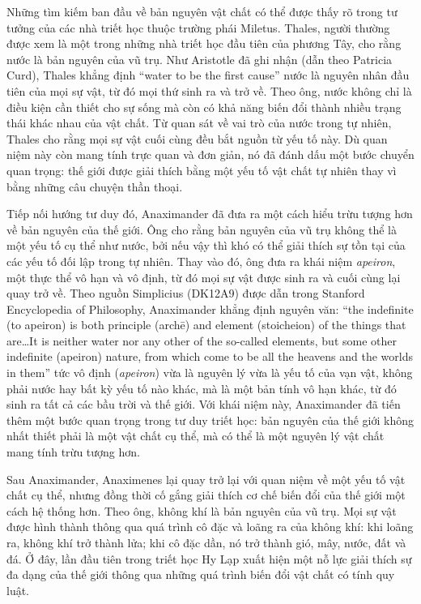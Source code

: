 \documentclass[14pt,a4paper]{extarticle}
\begin{document}
Những tìm kiếm ban đầu về bản nguyên vật chất có thể được thấy rõ trong tư tưởng của các nhà triết học thuộc trường phái Miletus. Thales, người thường được xem là một trong những nhà triết học đầu tiên của phương Tây, cho rằng nước là bản nguyên của vũ trụ. Như Aristotle đã ghi nhận (dẫn theo Patricia Curd), Thales khẳng định ``water to be the first cause''\cite{sep-presocratic} nước là nguyên nhân đầu tiên của mọi sự vật, từ đó mọi thứ sinh ra và trở về. Theo ông, nước không chỉ là điều kiện cần thiết cho sự sống mà còn có khả năng biến đổi thành nhiều trạng thái khác nhau của vật chất. Từ quan sát về vai trò của nước trong tự nhiên, Thales cho rằng mọi sự vật cuối cùng đều bắt nguồn từ yếu tố này. Dù quan niệm này còn mang tính trực quan và đơn giản, nó đã đánh dấu một bước chuyển quan trọng: thế giới được giải thích bằng một yếu tố vật chất tự nhiên thay vì bằng những câu chuyện thần thoại.

Tiếp nối hướng tư duy đó, Anaximander đã đưa ra một cách hiểu trừu tượng hơn về bản nguyên của thế giới. Ông cho rằng bản nguyên của vũ trụ không thể là một yếu tố cụ thể như nước, bởi nếu vậy thì khó có thể giải thích sự tồn tại của các yếu tố đối lập trong tự nhiên. Thay vào đó, ông đưa ra khái niệm \emph{apeiron}, một thực thể vô hạn và vô định, từ đó mọi sự vật được sinh ra và cuối cùng lại quay trở về. Theo nguồn Simplicius (DK12A9) được dẫn trong Stanford Encyclopedia of Philosophy, Anaximander khẳng định nguyên văn: ``the indefinite (to apeiron) is both principle (archē) and element (stoicheion) of the things that are\ldots It is neither water nor any other of the so-called elements, but some other indefinite (apeiron) nature, from which come to be all the heavens and the worlds in them''\cite{sep-presocratic} tức vô định (\emph{apeiron}) vừa là nguyên lý vừa là yếu tố của vạn vật, không phải nước hay bất kỳ yếu tố nào khác, mà là một bản tính vô hạn khác, từ đó sinh ra tất cả các bầu trời và thế giới. Với khái niệm này, Anaximander đã tiến thêm một bước quan trọng trong tư duy triết học: bản nguyên của thế giới không nhất thiết phải là một vật chất cụ thể, mà có thể là một nguyên lý vật chất mang tính trừu tượng hơn.

Sau Anaximander, Anaximenes lại quay trở lại với quan niệm về một yếu tố vật chất cụ thể, nhưng đồng thời cố gắng giải thích cơ chế biến đổi của thế giới một cách hệ thống hơn. Theo ông, không khí là bản nguyên của vũ trụ. Mọi sự vật được hình thành thông qua quá trình cô đặc và loãng ra của không khí: khi loãng ra, không khí trở thành lửa; khi cô đặc dần, nó trở thành gió, mây, nước, đất và đá. Ở đây, lần đầu tiên trong triết học Hy Lạp xuất hiện một nỗ lực giải thích sự đa dạng của thế giới thông qua những quá trình biến đổi vật chất có tính quy luật.
\end{document}
